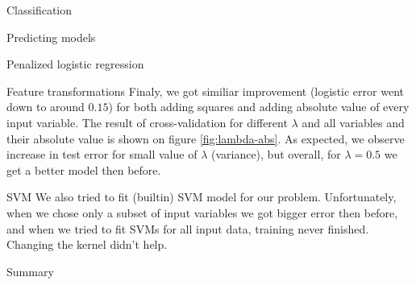 \documentclass{article}
\begin{document}
\begin{section}{Classification}
\begin{subsection}{Predicting models}
\begin{subsubsection}{Penalized logistic regression}
\begin{subsubsection}{Feature transformations}
Finaly, we got similiar improvement (logistic error went down to around $0.15$) for both adding squares and adding absolute value of every input variable. The result of cross-validation for different $\lambda$ and all variables and their absolute value is shown on figure \ref{fig:lambda-abs}. As expected, we observe increase in test error for small value of $\lambda$ (variance), but overall, for $\lambda = 0.5$ we get a better model then before.
\end{subsubsection}
\end{subsubsection}
\begin{subsubsection}{SVM}
We also tried to fit (builtin) SVM model for our problem. Unfortunately, when we chose only a subset of input variables we got bigger error then before, and when we tried to fit SVMs for all input data, training never finished. Changing the kernel didn't help.
\end{subsubsection}
\end{subsection}
\begin{subsection}{Summary}


\end{subsection}
\end{section}
\end{document}
